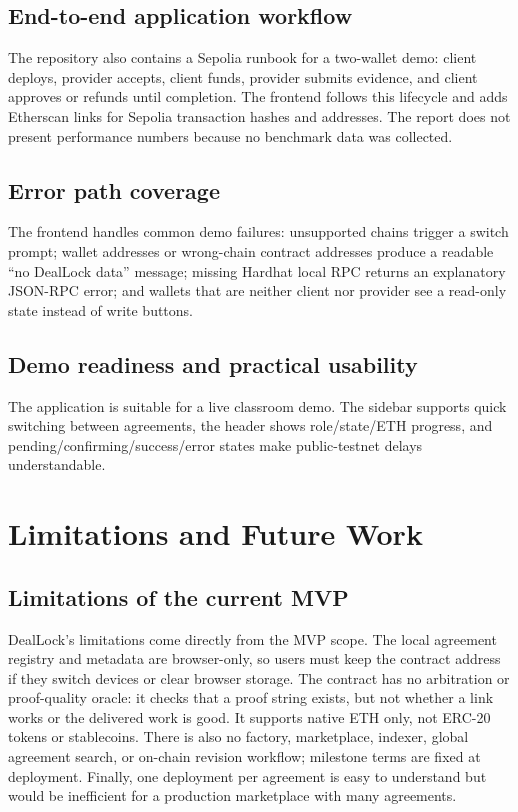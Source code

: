 \documentclass[12pt,a4paper]{article}
\begin{document}
\subsection{End-to-end application workflow}

The repository also contains a Sepolia runbook for a two-wallet demo: client
deploys, provider accepts, client funds, provider submits evidence, and client
approves or refunds until completion. The frontend follows this lifecycle and
adds Etherscan links for Sepolia transaction hashes and addresses. The report
does not present performance numbers because no benchmark data was collected.

\subsection{Error path coverage}

The frontend handles common demo failures: unsupported chains trigger a switch
prompt; wallet addresses or wrong-chain contract addresses produce a readable
``no DealLock data'' message; missing Hardhat local RPC returns an explanatory
JSON-RPC error; and wallets that are neither client nor provider see a read-only
state instead of write buttons.

\subsection{Demo readiness and practical usability}

The application is suitable for a live classroom demo. The sidebar supports quick
switching between agreements, the header shows role/state/ETH progress, and
pending/confirming/success/error states make public-testnet delays understandable.

\newpage
\section{Limitations and Future Work}
\label{sec:limitations}

\subsection{Limitations of the current MVP}

DealLock's limitations come directly from the MVP scope. The local agreement
registry and metadata are browser-only, so users must keep the contract address
if they switch devices or clear browser storage. The contract has no arbitration
or proof-quality oracle: it checks that a proof string exists, but not whether a
link works or the delivered work is good. It supports native ETH only, not ERC-20
tokens or stablecoins. There is also no factory, marketplace, indexer, global
agreement search, or on-chain revision workflow; milestone terms are fixed at
deployment. Finally, one deployment per agreement is easy to understand but would
be inefficient for a production marketplace with many agreements.
\end{document}
